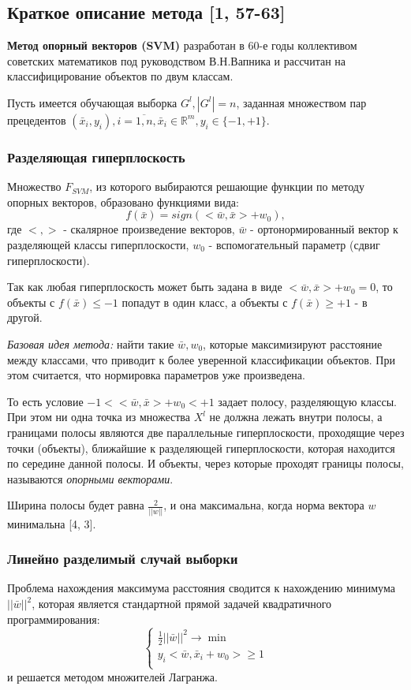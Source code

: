 \documentclass[main.tex]{subfiles}
\begin{document}
\subsection{Краткое описание метода [1, 57-63]}
\textbf{Метод опорный векторов (SVM)} разработан в 60-е годы коллективом советских математиков под руководством В.Н.Вапника и рассчитан на классифицирование объектов по двум классам.

Пусть имеется обучающая выборка $G^l,|G^l|=n$, заданная множеством пар прецедентов $(\bar{x}_i,y_i),i=\overline{1,n},\bar{x}_i\in\mathbb{R}^m,y_i\in\{-1,+1\}$.

\subsubsection{Разделяющая гиперплоскость}
Множество $F_{SVM}$, из которого выбираются решающие функции по методу опорных векторов, образовано функциями вида:
\begin{equation}
    f(\bar{x})=sign(<\bar{w},\bar{x}>+w_0),
\end{equation}
где $<,>$ - скалярное произведение векторов, $\bar{w}$ - ортонормированный вектор к разделяющей классы гиперплоскости, $w_0$ - вспомогательный параметр (сдвиг гиперплоскости).

Так как любая гиперплоскость может быть задана в виде $<\bar{w},\bar{x}>+w_0=0$, то объекты с $f(\bar{x})\leq-1$ попадут в один класс, а объекты с $f(\bar{x})\geq+1$ - в другой.

\textit{Базовая идея метода:} найти такие $\bar{w},w_0$, которые максимизируют расстояние между классами, что приводит к более уверенной классификации объектов. При этом считается, что нормировка параметров уже произведена.

То есть условие $-1<<\bar{w},\bar{x}>+w_0<+1$ задает полосу, разделяющую классы. При этом ни одна точка из множества $X^l$ не должна лежать внутри полосы, а границами полосы являются две параллельные гиперплоскости, проходящие через точки (объекты), ближайшие к разделяющей гиперплоскости, которая находится по середине данной полосы. И объекты, через которые проходят границы полосы, называются \textit{опорными векторами}.

Ширина полосы будет равна $\frac{2}{||w||}$, и она максимальна, когда норма вектора $w$ минимальна [4, 3].

\subsubsection{Линейно разделимый случай выборки}
Проблема нахождения максимума расстояния сводится к нахождению минимума $||\bar{w}||^2$, которая является стандартной прямой задачей квадратичного программирования:
\begin{equation}
    \left\{
    \begin{array}{ll}
        \frac{1}{2}||\bar{w}||^2\rightarrow\min\\
        y_i<\bar{w},\bar{x}_i+w_0>\geq1\\
    \end{array}
    \right.
\end{equation}
и решается методом множителей Лагранжа.
\end{document}
